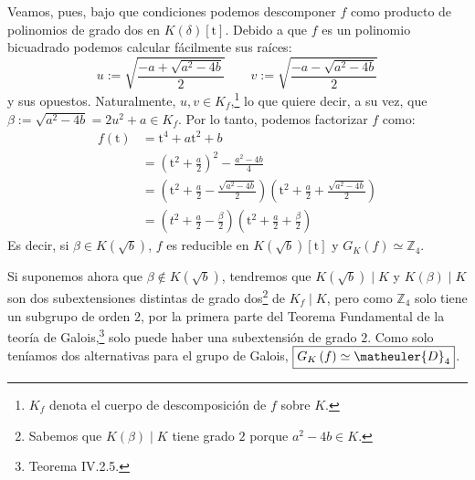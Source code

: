 \begin{sol}
    Veamos, pues, bajo que condiciones podemos descomponer $f$ como producto de polinomios de grado dos en $K\left( \delta \right)\left[ \mathrm{t} \right]$. Debido a que $f$ es un polinomio bicuadrado podemos calcular fácilmente sus raíces:
    \[
    u := \sqrt{\frac{-a + \sqrt{a^2 - 4b}}{2}}\qquad v := \sqrt{\frac{-a - \sqrt{a^2 - 4b}}{2}}
    \]
    y sus opuestos. Naturalmente, $u,v \in K_f$,\footnote{$K_f$ denota el cuerpo de descomposición de $f$ sobre $K$.} lo que quiere decir, a su vez, que $\beta := \sqrt{a^2 - 4b} = 2u^2 + a \in K_f$. Por lo tanto, podemos factorizar $f$ como:
    \begin{align*}
        f\left( \mathrm{t} \right) &= \mathrm{t}^4 + a \mathrm{t}^2 + b\\
        &= \left( \mathrm{t}^2 + \frac{a}{2} \right)^2 - \frac{a^2 - 4b}{4}\\
        &= \left( \mathrm{t}^2 + \frac{a}{2} - \frac{\sqrt{a^2 - 4b}}{2} \right) \left( \mathrm{t}^2 + \frac{a}{2} + \frac{\sqrt{a^2 - 4b}}{2} \right)\\
        &= \left( t^2 + \frac{a}{2} - \frac{\beta}{2} \right)\left( \mathrm{t}^2 + \frac{a}{2} + \frac{\beta}{2} \right)
    \end{align*}
    Es decir, si $\beta \in K\left( \sqrt{b} \right)$, $f$ es reducible en $K\left( \sqrt{b} \right)\left[ \mathrm{t} \right]$ y $\boxed{G_K\left( f \right) \simeq \mathbb{Z}_4}$.

    Si suponemos ahora que $\beta \not\in K\left( \sqrt{b} \right)$, tendremos que $K\left( \sqrt{b} \right) \mid K$ y $K\left( \beta \right) \mid K$ son dos subextensiones distintas de grado dos\footnote{Sabemos que $K\left( \beta \right) \mid K$ tiene grado $2$ porque $a^2 - 4b \in K$.} de $K_f \mid K$, pero como $\mathbb{Z}_4$ solo tiene un subgrupo de orden $2$, por la primera parte del Teorema Fundamental de la teoría de Galois,\footnote{Teorema IV.2.5\cite{cuerpos}.} solo puede haber una subextensión de grado $2$. Como solo teníamos dos alternativas para el grupo de Galois, $\boxed{G_K\left( f \right) \simeq \matheuler{D}_4}$.
\end{sol}
